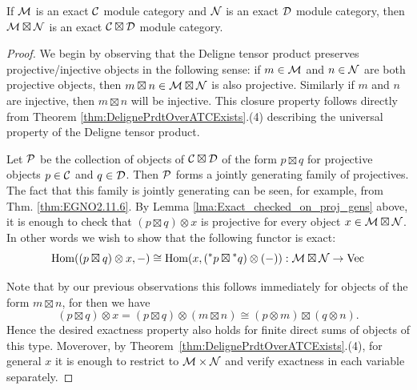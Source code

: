 \documentclass{amsart}
\begin{document}
\begin{theorem}\label{thm:tensor-exactness}
If $\mathcal M$ is an exact $\mathcal C$ module category and $\mathcal N$ is an exact $\mathcal D$ module category, then $\mathcal M \boxtimes \mathcal N$ is an exact $\mathcal C \boxtimes \mathcal D$ module category.
\end{theorem}
\begin{proof}
We begin by observing that the Deligne tensor product preserves projective/injective objects in the following sense: if $m \in \mathcal M$ and $n \in \mathcal N$ are both projective objects, then $m \boxtimes n \in \mathcal M \boxtimes \mathcal N$ is also projective. Similarly if $m$ and $n$ are injective, then $m \boxtimes n$ will be injective. This closure property follows directly from Theorem \ref{thm:DelignePrdtOverATCExists}.(4) describing the universal property of the Deligne tensor product. 	
	
Let $\mathcal P$ be the collection of objects of $\mathcal C \boxtimes \mathcal D$ of the form $p \boxtimes q$ for projective objects $p \in \mathcal C$ and $q \in \mathcal D$. Then $\mathcal P$ forms a jointly generating family of projectives. The fact that this family is jointly generating can be seen, for example, from Thm. \ref{thm:EGNO2.11.6}. By Lemma \ref{lma:Exact_checked_on_proj_gens} above, it is enough to check that $(p \boxtimes q) \otimes x$ is projective for every object $x \in \mathcal M \boxtimes \mathcal N$. In other words we wish to show that the following functor is exact:
\begin{equation*}
	\operatorname{Hom}((p \boxtimes q) \otimes x, -) \cong \operatorname{Hom}(x, ({}^*p \boxtimes {}^*q) \otimes(-) ): \mathcal M \boxtimes \mathcal N \to \mathrm{Vec}
\end{equation*}

Note that by our previous observations this follows immediately for objects of the form $ m \boxtimes n$, for then we have
\begin{equation*}
	(p \boxtimes q) \otimes x = (p \boxtimes q) \otimes (m \boxtimes n) \cong (p \otimes m) \boxtimes (q \otimes n).
\end{equation*}
Hence the desired exactness property also holds for finite direct sums of objects of this type. Moverover, by Theorem~\ref{thm:DelignePrdtOverATCExists}.(4), for general $x$ it is enough to restrict to $\mathcal M \times \mathcal N$ and 
verify exactness in each variable separately. 


\end{proof}
\end{document}

